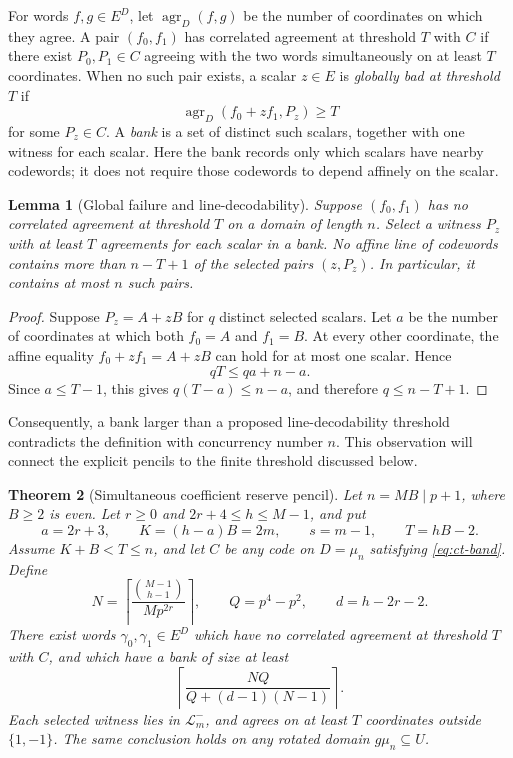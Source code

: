 \documentclass[11pt,letterpaper]{article}
\newtheorem{theorem}{Theorem}[section]
\newtheorem{lemma}[theorem]{Lemma}
\theoremstyle{definition}
\theoremstyle{remark}
\begin{document}
For words $f,g\in E^D$, let $\operatorname{agr}_D(f,g)$ be the number of
coordinates on which they agree. A pair $(f_0,f_1)$ has correlated agreement
at threshold $T$ with $C$ if there exist $P_0,P_1\in C$ agreeing with the
two words simultaneously on at least $T$ coordinates. When no such pair
exists, a scalar $z\in E$ is \emph{globally bad at threshold $T$} if
\[
  \operatorname{agr}_D(f_0+zf_1,P_z)\ge T
\]
for some $P_z\in C$. A \emph{bank} is a set of distinct such scalars,
together with one witness for each scalar. Here the bank records only which scalars have nearby codewords; it
does not require those codewords to depend affinely on the scalar.

\begin{lemma}[Global failure and line-decodability]
\label{lem:ct-concurrency}
Suppose $(f_0,f_1)$ has no correlated agreement at threshold $T$ on a
domain of length $n$. Select a witness $P_z$ with at least $T$ agreements
for each scalar in a bank. No affine line of codewords contains more than
$n-T+1$ of the selected pairs $(z,P_z)$. In particular, it contains at most
$n$ such pairs.
\end{lemma}
\begin{proof}
Suppose $P_z=A+zB$ for $q$ distinct selected scalars. Let $a$ be the number
of coordinates at which both $f_0=A$ and $f_1=B$. At every other coordinate,
the affine equality $f_0+zf_1=A+zB$ can hold for at most one scalar. Hence
\[
  qT\le qa+n-a.
\]
Since $a\le T-1$, this gives
$q(T-a)\le n-a$, and therefore $q\le n-T+1$.
\end{proof}

Consequently, a bank larger than a proposed line-decodability threshold
contradicts the definition with concurrency number $n$. This observation
will connect the explicit pencils to the finite threshold discussed below.

\begin{theorem}[Simultaneous coefficient reserve pencil]
\label{thm:ct-reserve}
Let $n=MB\mid p+1$, where $B\ge2$ is even. Let $r\ge0$ and
$2r+4\le h\le M-1$, and put
\[
 a=2r+3,\qquad K=(h-a)B=2m,\qquad s=m-1,\qquad T=hB-2.
\]
Assume $K+B<T\le n$, and let $C$ be any code on $D=\mu_n$ satisfying
\eqref{eq:ct-band}. Define
\begin{equation}\label{eq:ct-reserve-counts}
 N=\left\lceil\frac{\binom{M-1}{h-1}}{M p^{2r}}\right\rceil,
 \qquad Q=p^4-p^2,\qquad d=h-2r-2.
\end{equation}
There exist words $\gamma_0,\gamma_1\in E^D$ which have no correlated
agreement at threshold $T$ with $C$, and which have a bank of size at least
\begin{equation}\label{eq:ct-bank}
 \left\lceil\frac{NQ}{Q+(d-1)(N-1)}\right\rceil.
\end{equation}
Each selected witness lies in $\mathcal L^-_m$, and agrees on at least
$T$ coordinates outside $\{1,-1\}$. The same conclusion holds on any
rotated domain $g\mu_n\subseteq U$.
\end{theorem}
\end{document}
